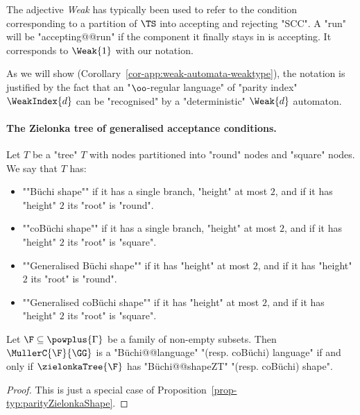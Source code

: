 \documentclass[10pt,a4paper]{amsart}
\begin{document}
The adjective \textit{Weak} has typically been used to refer to the condition corresponding to a partition of $\TS$ into accepting and rejecting "SCC". A "run" will be "accepting@@run" if the component it finally stays in is accepting. It corresponds to $\Weak{1}$ with our notation.

As we will show (Corollary~\ref{cor-app:weak-automata-weaktype}), the notation is justified by the fact that an "$\oo$-regular language" of "parity index" $\WeakIndex{d}$ can be "recognised" by a "deterministic" $\Weak{d}$ automaton.



\paragraph*{The Zielonka tree of generalised acceptance conditions.}
\begin{definition}
	Let $T$ be a "tree" $T$ with nodes partitioned into "round" nodes and "square" nodes. We say that $T$ has:
	\begin{itemize}
		\item ""B\"uchi shape"" if it has a single branch, "height" at most $2$, and if it has "height" $2$ its "root" is "round".
		\item ""coB\"uchi shape"" if it has a single branch, "height" at most $2$, and if it has "height" $2$ its "root" is "square".
		
		\item  \AP""Generalised B\"uchi shape"" if it has "height" at most $2$, and if it has "height" $2$ its "root" is "round".
		
		\item  \AP""Generalised coB\"uchi shape"" if it has "height" at most $2$, and if it has "height" $2$ its "root" is "square".
	\end{itemize}
\end{definition}


\begin{proposition}
	Let $\F\subseteq \powplus{\Gamma}$ be a family of non-empty subsets. Then $\MullerC{\F}{\GG}$ is a "B\"uchi@@language" "(resp. coB\"uchi) language" if and only if $\zielonkaTree{\F}$ has "B\"uchi@@shapeZT" "(resp. coB\"uchi) shape".
\end{proposition}
\begin{proof}
	This is just a special case of Proposition~\ref{prop-typ:parityZielonkaShape}.
\end{proof}
\end{document}
